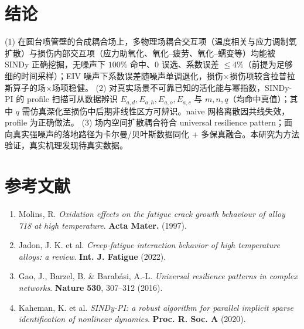 \documentclass[11pt,a4paper]{article}
\begin{document}
\section{结论}
(1) 在圆台喷管壁的合成耦合场上，多物理场耦合交互项（温度相关与应力调制氧扩散）与损伤内部交互项（应力助氧化、氧化–疲劳、氧化–蠕变等）均能被 SINDy 正确挖掘，无噪声下 $100\%$ 命中、$0$ 误选、系数误差 $\le 4\%$（前提为足够细的时间采样）；EIV 噪声下系数误差随噪声单调退化，损伤×损伤项较含拉普拉斯算子的场×场项稳健。
(2) 对真实场景不可靠已知的活化能与幂指数，SINDy-PI 的 profile 扫描可从数据辨识 $E_{a,d},E_{a,h},E_{a,o},E_{a,c}$ 与 $m,n,q$（均命中真值）；其中 $q$ 需仿真深化至损伤中后期非线性区方可辨识。naive 网格离散因共线失效，profile 为正确做法。
(3) 场内空间扩散耦合符合 universal resilience pattern；面向真实强噪声的落地路径为卡尔曼/贝叶斯数据同化 + 多保真融合。本研究为方法验证，真实机理发现待真实数据。

\section*{参考文献}
\begin{enumerate}\setlength{\itemsep}{1pt}
\item Molins, R. \textit{Oxidation effects on the fatigue crack growth behaviour of alloy 718 at high temperature}. \textbf{Acta Mater.} (1997).
\item Jadon, J. K. et al. \textit{Creep-fatigue interaction behavior of high temperature alloys: a review}. \textbf{Int. J. Fatigue} (2022).
\item Gao, J., Barzel, B. \& Barabási, A.-L. \textit{Universal resilience patterns in complex networks}. \textbf{Nature} \textbf{530}, 307--312 (2016).
\item Kaheman, K. et al. \textit{SINDy-PI: a robust algorithm for parallel implicit sparse identification of nonlinear dynamics}. \textbf{Proc. R. Soc. A} (2020).
\end{enumerate}
\end{document}
